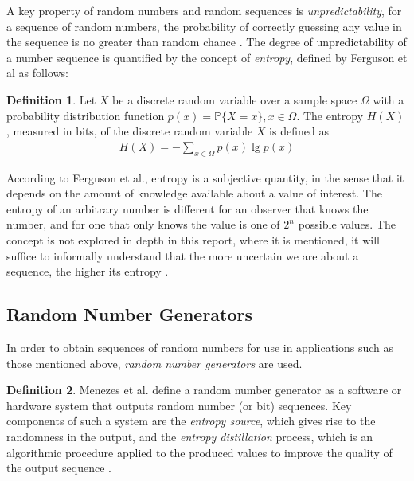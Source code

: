 \documentclass[12pt, titlepage]{report}
\theoremstyle{definition}
\newtheorem{definition}{Definition}
\begin{document}
A key property of random numbers and random sequences is \emph{unpredictability}, for a sequence of random numbers, the probability of correctly guessing any value in the sequence is no greater than random chance \cite[p. 7]{barker2007recommendation}. The degree of unpredictability of a number sequence is quantified by the concept of \emph{entropy}, defined by Ferguson et al \cite[p. 12-13]{cover2012elements} as follows:

\begin{definition}
Let $X$ be a discrete random variable over a sample space $\Omega$ with a probability distribution function $p(x)=\mathbb{P}\{X=x\}, x\in\Omega$.  The entropy $H(X)$, measured in bits, of the discrete random variable $X$ is defined as
\begin{gather}\label{eq:entropy}
H(X) = -\sum_{x\in\Omega} p(x) \lg p(x)
\end{gather}
\end{definition}

According to Ferguson et al., entropy is a subjective quantity, in the sense that it depends on the amount of knowledge available about a value of interest. The entropy of an arbitrary number is different for an observer that knows the number, and for one that only knows the value is one of $2^{n}$ possible values. The concept is not explored in depth in this report, where it is mentioned, it will suffice to informally understand that the more uncertain we are about a sequence, the higher its entropy \cite[p. 137]{ferguson2010cryptography}.



\subsection{Random Number Generators}
In order to obtain sequences of random numbers for use in applications such as those mentioned above, \emph{random number generators} are used.

\begin{definition}
Menezes et al. define a random number generator as a software or hardware system that outputs random number (or bit) sequences. Key components of such a system are the \emph{entropy source}, which gives rise to the randomness in the output, and the \emph{entropy distillation} process, which is an algorithmic procedure applied to the produced values to improve the quality of the output sequence \cite{menezes1996handbook}.
\end{definition}
\end{document}
